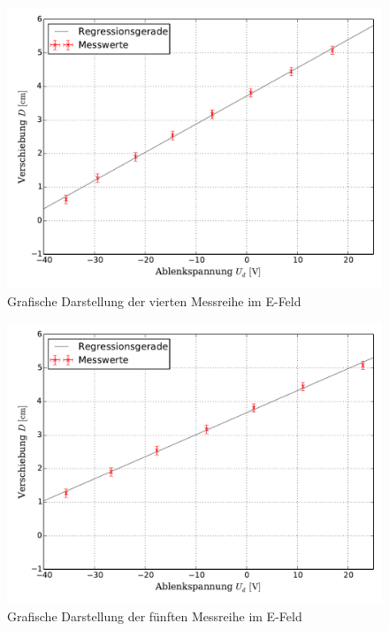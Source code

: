 		\begin{figure}[!h]
		\centering
				\includegraphics[scale=0.6]{Grafiken/EFeld_Messreihe_IV.pdf}
				\caption{Grafische Darstellung der vierten Messreihe im E-Feld}\label{fig:Auswertung_Messdaten_I_IV}
		\end{figure}
		
		\begin{figure}[!h]
		\centering
				\includegraphics[scale=0.6]{Grafiken/EFeld_Messreihe_V.pdf}
				\caption{Grafische Darstellung der fünften Messreihe im E-Feld}\label{fig:Auswertung_Messdaten_I_V}
		\end{figure}
	\vspace*{20cm}
	\newpage
